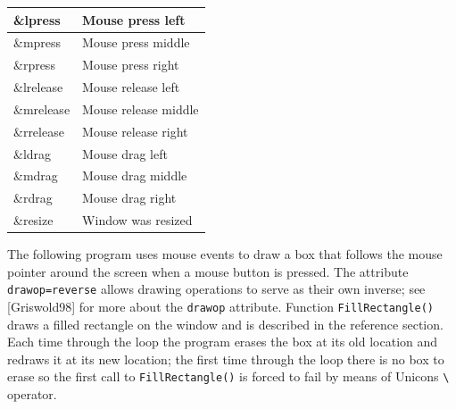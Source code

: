 \begin{center}
\begin{supertabular}{|m{0.9247598in}|m{2.3525598in}|}
\sffamily \&lpress &
Mouse press left\\\hline
\sffamily \&mpress &
Mouse press middle\\\hline
\sffamily \&rpress &
Mouse press right\\\hline
\sffamily \&lrelease &
Mouse release left\\\hline
\sffamily \&mrelease &
Mouse release middle\\\hline
\sffamily \&rrelease &
Mouse release right \\\hline
\sffamily \&ldrag &
Mouse drag left \\\hline
\sffamily \&mdrag &
Mouse drag middle \\\hline
\sffamily \&rdrag &
Mouse drag right \\\hline
\sffamily \&resize &
Window was resized \\\hline
\end{supertabular}
\end{center}
The following program uses mouse events to draw a box that follows the
mouse pointer around the screen when a mouse button is pressed. The
attribute \texttt{drawop=reverse} allows drawing operations to serve as
their own inverse; see [Griswold98] for more about the \texttt{drawop}
attribute. Function \texttt{FillRectangle()} draws a filled rectangle
on the window and is described in the reference section. Each time
through the loop the program erases the box at its old location and
redraws it at its new location; the first time through the loop there
is no box to erase so the first call to \texttt{FillRectangle()} is
forced to fail by means of Unicon{\textquotesingle}s
\texttt{{\textbackslash}} operator.


